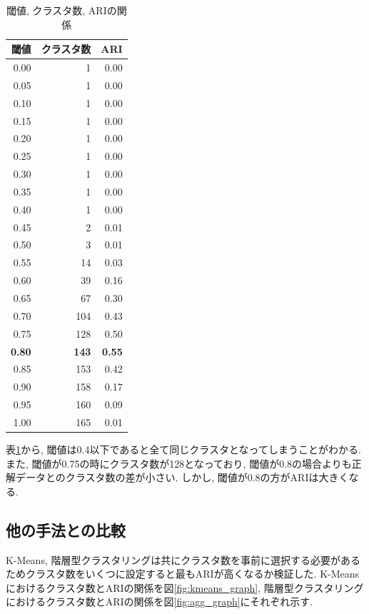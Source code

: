 \begin{table}[H]
  \caption{閾値, クラスタ数, ARIの関係}
  \label{tb:cw_result}
  \begin{center}
  \begin{tabular}{r|r|r}
    \hline
    閾値&クラスタ数&ARI\\\hline\hline
    0.00&1&0.00\\\hline
    0.05&1&0.00\\\hline
    0.10&1&0.00\\\hline
    0.15&1&0.00\\\hline
    0.20&1&0.00\\\hline
    0.25&1&0.00\\\hline
    0.30&1&0.00\\\hline
    0.35&1&0.00\\\hline
    0.40&1&0.00\\\hline
    0.45&2&0.01\\\hline
    0.50&3&0.01\\\hline
    0.55&14&0.03\\\hline
    0.60&39&0.16\\\hline
    0.65&67&0.30\\\hline
    0.70&104&0.43\\\hline
    0.75&128&0.50\\\hline
    \textbf{0.80}&\textbf{143}&\textbf{0.55}\\\hline
    0.85&153&0.42\\\hline
    0.90&158&0.17\\\hline
    0.95&160&0.09\\\hline
    1.00&165&0.01\\\hline
  \end{tabular}\end{center}
\end{table}

表\ref{tb:cw_result}から, 閾値は0.4以下であると全て同じクラスタとなってしまうことがわかる. 
また, 閾値が0.75の時にクラスタ数が128となっており, 閾値が0.8の場合よりも正解データとのクラスタ数の差が小さい. しかし, 閾値が0.8の方がARIは大きくなる. 


\subsection{他の手法との比較}

K-Means, 階層型クラスタリングは共にクラスタ数を事前に選択する必要があるためクラスタ数をいくつに設定すると最もARIが高くなるか検証した. 
K-Meansにおけるクラスタ数とARIの関係を図\ref{fig:kmeans_graph}, 階層型クラスタリングにおけるクラスタ数とARIの関係を図\ref{fig:agg_graph}にそれぞれ示す.

